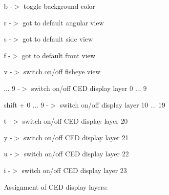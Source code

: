\begin{DoxyItemize}
\item {\ttfamily  b } -\/$>$ toggle background color
\item {\ttfamily  r } -\/$>$ got to default angular view
\item {\ttfamily  s } -\/$>$ got to default side view
\item {\ttfamily  f } -\/$>$ got to default front view
\item {\ttfamily  v } -\/$>$ switch on/off fisheye view
\item { ... 9 } -\/$>$ switch on/off C\-E\-D display layer 0 ... 9
\item {\ttfamily  shift + 0 ... 9 } -\/$>$ switch on/off display layer 10 ... 19
\item {\ttfamily  t } -\/$>$ switch on/off C\-E\-D display layer 20
\item {\ttfamily  y } -\/$>$ switch on/off C\-E\-D display layer 21
\item {\ttfamily  u } -\/$>$ switch on/off C\-E\-D display layer 22
\item {\ttfamily  i } -\/$>$ switch on/off C\-E\-D display layer 23
\end{DoxyItemize}

Assignment of C\-E\-D display layers\-:



